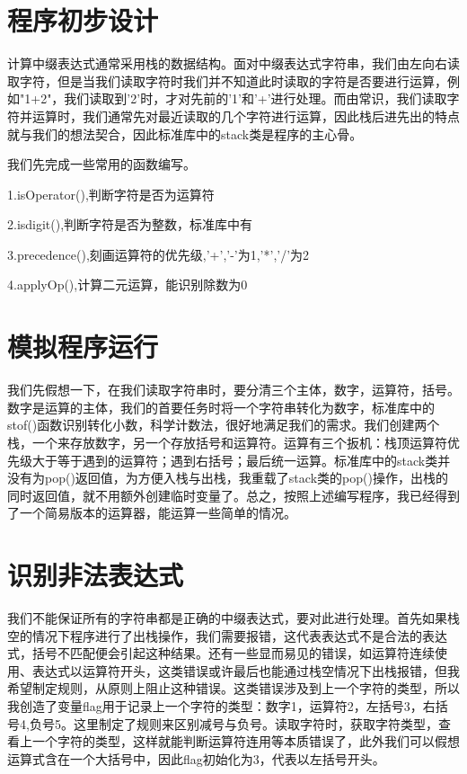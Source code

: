 \documentclass[UTF8]{ctexart}
\begin{document}
	
	\pagestyle{fancy}
	\fancyhead{}
	
\section{程序初步设计}
\hspace{0em}计算中缀表达式通常采用栈的数据结构。面对中缀表达式字符串，我们由左向右读取字符，但是当我们读取字符时我们并不知道此时读取的字符是否要进行运算，例如"1+2"，我们读取到'2'时，才对先前的'1'和'+'进行处理。而由常识，我们读取字符并运算时，我们通常先对最近读取的几个字符进行运算，因此栈后进先出的特点就与我们的想法契合，因此标准库中的stack类是程序的主心骨。

\hspace{0em}我们先完成一些常用的函数编写。

1.isOperator(),判断字符是否为运算符

2.isdigit(),判断字符是否为整数，标准库中有

3.precedence(),刻画运算符的优先级,'+','-'为1,'*','/'为2

4.applyOp(),计算二元运算，能识别除数为0

\section{模拟程序运行}
\hspace{0em}我们先假想一下，在我们读取字符串时，要分清三个主体，数字，运算符，括号。数字是运算的主体，我们的首要任务时将一个字符串转化为数字，标准库中的stof()函数识别转化小数，科学计数法，很好地满足我们的需求。我们创建两个栈，一个来存放数字，另一个存放括号和运算符。运算有三个扳机：栈顶运算符优先级大于等于遇到的运算符；遇到右括号；最后统一运算。标准库中的stack类并没有为pop()返回值，为方便入栈与出栈，我重载了stack类的pop()操作，出栈的同时返回值，就不用额外创建临时变量了。总之，按照上述编写程序，我已经得到了一个简易版本的运算器，能运算一些简单的情况。

\section{识别非法表达式}
\hspace{0em}我们不能保证所有的字符串都是正确的中缀表达式，要对此进行处理。首先如果栈空的情况下程序进行了出栈操作，我们需要报错，这代表表达式不是合法的表达式，括号不匹配便会引起这种结果。还有一些显而易见的错误，如运算符连续使用、表达式以运算符开头，这类错误或许最后也能通过栈空情况下出栈报错，但我希望制定规则，从原则上阻止这种错误。这类错误涉及到上一个字符的类型，所以我创造了变量flag用于记录上一个字符的类型：数字1，运算符2，左括号3，右括号4,负号5。这里制定了规则来区别减号与负号。读取字符时，获取字符类型，查看上一个字符的类型，这样就能判断运算符连用等本质错误了，此外我们可以假想运算式含在一个大括号中，因此flag初始化为3，代表以左括号开头。
\end{document}
